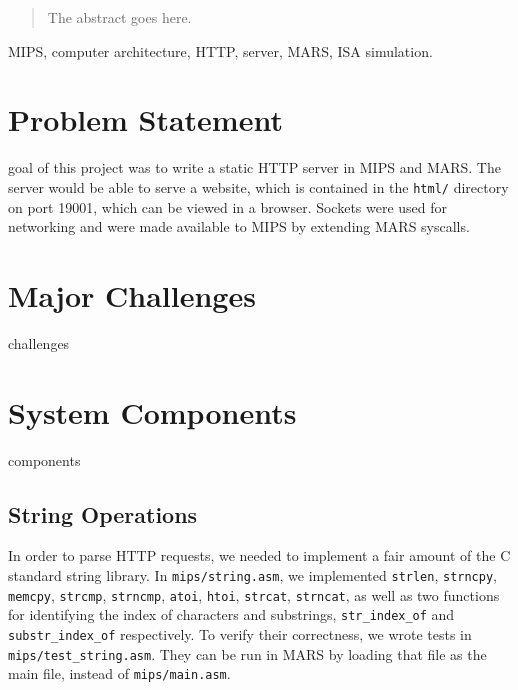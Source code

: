 \documentclass[journal,10pt]{IEEEtran}
\begin{document}
\maketitle

\begin{abstract}
The abstract goes here.
\end{abstract}

\begin{IEEEkeywords}
MIPS, computer architecture, HTTP, server, MARS, ISA simulation.
\end{IEEEkeywords}


\section{Problem Statement}
% 
% 
 goal of this project was to write a static HTTP server in MIPS and MARS. The server would be able to serve a website, which is contained in the \texttt{html/} directory on port 19001, which can be viewed in a browser. Sockets were used for networking and were made available to MIPS by extending MARS syscalls.


\section{Major Challenges}

challenges

\section{System Components}

components

\subsection{String Operations}

In order to parse HTTP requests, we needed to implement a fair amount of the C
standard string library.  In \texttt{mips/string.asm}, we implemented
\texttt{strlen}, \texttt{strncpy}, \texttt{memcpy}, \texttt{strcmp},
\texttt{strncmp}, \texttt{atoi}, \texttt{htoi}, \texttt{strcat},
\texttt{strncat}, as well as two functions for identifying the index of
characters and substrings, \texttt{str\_index\_of} and
\texttt{substr\_index\_of} respectively.  To verify their correctness, we wrote
tests in \texttt{mips/test\_string.asm}.  They can be run in MARS by loading
that file as the main file, instead of \texttt{mips/main.asm}.
\end{document}
